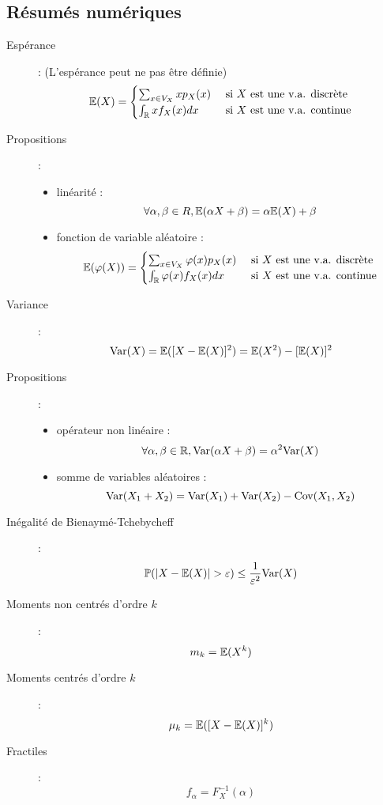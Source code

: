\subsection{Résumés numériques}
\begin{description}
\item[Espérance] : (L'espérance peut ne pas être définie)
    \[
        \mathbb{E}(X)=\begin{cases}
            \sum_{x\in V_X}xp_X(x) & \textrm{ si } X\textrm{ est une v.a. discrète} \\
            \int_{\mathbb{R}} xf_X(x)dx & \textrm{ si } X\textrm{ est une v.a. continue}
        \end{cases}
    \]
\item[Propositions] :
    \begin{itemize}
        \item linéarité : 
            \[ \forall \alpha,\beta\in R, \mathbb{E}(\alpha X+\beta)=\alpha\mathbb{E}(X)+\beta \]
        \item fonction de variable aléatoire :
            \[ \mathbb{E}(\varphi(X)) = \begin{cases}
                \sum_{x\in V_X}\varphi(x)p_X(x) & \textrm{ si } X\textrm{ est une v.a. discrète} \\
                \int_{\mathbb{R}} \varphi(x)f_X(x)dx & \textrm{ si } X\textrm{ est une v.a. continue}
            \end{cases} \]
    \end{itemize}
\item[Variance] : \[ \textrm{Var}(X)=\mathbb{E}( [ X-\mathbb{E}(X) ]^2 ) = \mathbb{E}(X^2)-[\mathbb{E}(X)]^2 \]
\item[Propositions] :
    \begin{itemize}
        \item opérateur non linéaire :  \[ \forall\alpha,\beta\in\mathbb{R}, \textrm{Var}(\alpha X+\beta) = \alpha^2\textrm{Var}(X) \]
        \item somme de variables aléatoires :
            \[
                \textrm{Var}(X_1+X_2) = \textrm{Var}(X_1) + \textrm{Var}(X_2) - \textrm{Cov}(X_1,X_2)
            \]
    \end{itemize}
\item[Inégalité de Bienaymé-Tchebycheff] : 
    \[
        \P(|X-\E(X)|>\varepsilon) \le \frac{1}{\varepsilon^2}\Var(X)
    \]
\item[Moments non centrés d'ordre $k$] : 
    \[
        m_k = \mathbb{E}(X^k)
    \]
\item[Moments centrés d'ordre $k$] :
    \[
        \mu_k = \mathbb{E}( [X-\mathbb{E}(X)]^k )
    \]
\item[Fractiles] : 
    \[
        f_\alpha = F^{-1}_X(\alpha)
    \]
\end{description}
